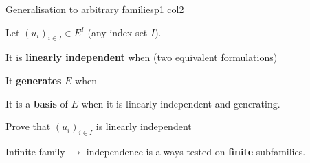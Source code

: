 \documentclass[sheet,noautoquant,noautokw]{neyvia-study}
\begin{document}
\begin{concept}[1.16]{Generalisation to arbitrary families}{p1 col2}
\begin{definition}
\noindent Let $(u_i)_{i\in I}\in E^I$ (any index set $I$).
\par\noindent It is \textbf{linearly independent} when (two equivalent formulations)
\par\noindent It \textbf{generates} $E$ when
\par\noindent It is a \textbf{basis} of $E$ when it is linearly independent and generating.
\end{definition}
\begin{method}{Prove that $(u_i)_{i\in I}$ is linearly independent}
\step{$\displaystyle \cdots$}
\end{method}
\begin{reflex}
Infinite family \ensuremath{\rightarrow} independence is always tested on \textbf{finite} subfamilies.
\end{reflex}
\end{concept}
\end{document}
